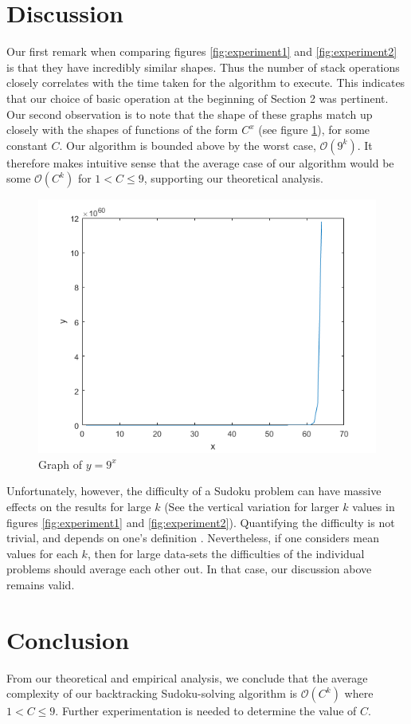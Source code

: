 \documentclass[a4paper]{article}
\begin{document}
\section{Discussion}
Our first remark when comparing figures \ref{fig:experiment1} and \ref{fig:experiment2} is that they have incredibly similar shapes. Thus the number of stack operations closely correlates with the time taken for the algorithm to execute. This indicates that our choice of basic operation at the beginning of Section 2 was pertinent.
\newline
Our second observation is to note that the shape of these graphs match up closely with the shapes of functions of the form $C^x$ (see figure \ref{fig:nineToTheK}), for some constant $C$. Our algorithm is bounded above by the worst case, $\mathcal{O}(9^k)$. It therefore makes intuitive sense that the average case of our algorithm would be some $\mathcal{O}(C^k)$ for $1<C\leq9$, supporting our theoretical analysis.
\begin{figure}[H]
    \centering
    \includegraphics[scale=0.6]{nineToTheK.png}
    \caption{Graph of $y=9^x$}
    \label{fig:nineToTheK}
\end{figure}
Unfortunately, however, the difficulty of a Sudoku problem can have massive effects on the results for large $k$ (See the vertical variation for larger $k$ values in figures \ref{fig:experiment1} and \ref{fig:experiment2}). Quantifying the difficulty is not trivial, and depends on one's definition \cite{watanabe_2013}. Nevertheless, if one considers mean values for each $k$, then for large data-sets the difficulties of the individual problems should average each other out. In that case, our discussion above remains valid.
\section{Conclusion}
From our theoretical and empirical analysis, we conclude that the average complexity of our backtracking Sudoku-solving algorithm is $\mathcal{O}(C^k)$ where $1 < C \leq 9$. 
\newline
 Further experimentation is needed to determine the value of $C$.
 \newpage


\end{document}
